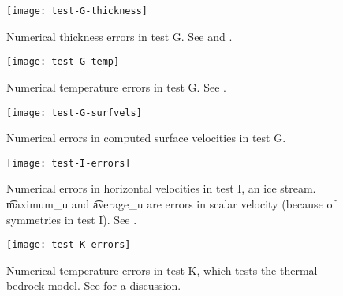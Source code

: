 \begin{figure}[ht]
\centering
\texttt{[image: test-G-thickness]}
\caption{Numerical thickness errors in test G.  See \cite{BBL} and \cite{BLKCB}.}
\label{fig:thickerrsG}
\end{figure}

\begin{figure}[ht]
\centering
\texttt{[image: test-G-temp]}
\caption{Numerical temperature errors in test G. See \cite{BBL}.}
\label{fig:temperrsG}
\end{figure}

\begin{figure}[ht]
\centering
\texttt{[image: test-G-surfvels]}
\caption{Numerical errors in computed surface velocities in test G.}
\label{fig:surfvelerrsG}
\end{figure}

\begin{figure}[ht]
\centering
\texttt{[image: test-I-errors]}
\caption{Numerical errors in horizontal velocities in test I, an ice stream. \t{maximum_u} and \t{average_u} are errors in scalar velocity (because of symmetries in test I).  See \cite{SchoofStream,BBssasliding}.}
\label{fig:velerrsI}
\end{figure}

\begin{figure}[ht]
\centering
\texttt{[image: test-K-errors]}
\caption{Numerical temperature errors in test K, which tests the thermal bedrock model.  See \cite{BuelerTestK} for a discussion.}
\label{fig:temperrsK}
\end{figure}


